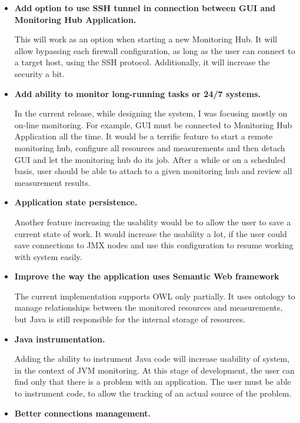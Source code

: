 \begin{itemize}

\item {\bf Add option to use SSH tunnel in connection between GUI and Monitoring Hub Application.}

This will work as an option when starting a new Monitoring Hub. It will allow bypassing each firewall configuration, as long as the user can connect to a target host, using the SSH protocol. Additionally, it will increase the security a bit.

\item {\bf Add ability to monitor long-running tasks or 24/7 systems.}

In the current release, while designing the system, I was focusing mostly on on-line monitoring. For example, GUI must be connected to Monitoring Hub Application all the time. It would be a terrific feature to start a remote monitoring hub, configure all resources and measurements and then detach GUI and let the monitoring hub do its job. After a while or on a scheduled basis, user should be able to attach to a given monitoring hub and review all measurement results.

\item {\bf Application state persistence.}

Another feature increasing the usability would be to allow the user to save a current state of work. It would increase the usability a lot, if the user could save connections to JMX nodes and use this configuration to resume working with system easily.

\item {\bf Improve the way the application uses Semantic Web framework}

The current implementation supports OWL only partially. It uses ontology to manage relationships between the monitored resources and measurements, but Java is still responsible for the internal storage of resources.

\item {\bf Java instrumentation.}

Adding the ability to instrument Java code will increase usability of system, in the context of JVM monitoring. At this stage of development, the user can find only that there is a problem with an application. The user must be able to instrument code, to allow the tracking of an actual source of the problem.

\item {\bf Better connections management.}


\end{itemize}
